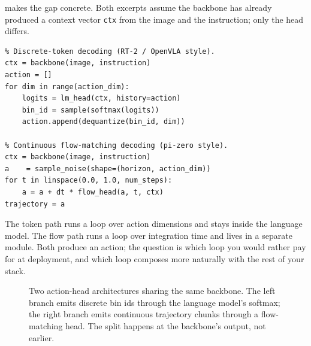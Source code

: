  makes the gap concrete. Both excerpts assume the backbone has already produced a context vector \texttt{ctx} from the image and the instruction; only the head differs.

\begin{verbatim}
% Discrete-token decoding (RT-2 / OpenVLA style).
ctx = backbone(image, instruction)
action = []
for dim in range(action_dim):
    logits = lm_head(ctx, history=action)
    bin_id = sample(softmax(logits))
    action.append(dequantize(bin_id, dim))

% Continuous flow-matching decoding (pi-zero style).
ctx = backbone(image, instruction)
a    = sample_noise(shape=(horizon, action_dim))
for t in linspace(0.0, 1.0, num_steps):
    a = a + dt * flow_head(a, t, ctx)
trajectory = a
\end{verbatim}

 The token path runs a loop over action dimensions and stays inside the language model. The flow path runs a loop over integration time and lives in a separate module. Both produce an action; the question is which loop you would rather pay for at deployment, and which loop composes more naturally with the rest of your stack.

\begin{figure}
\centering
{}
\caption{Two action-head architectures sharing the same backbone. The left branch emits discrete bin ids through the language model's softmax; the right branch emits continuous trajectory chunks through a flow-matching head. The split happens at the backbone's output, not earlier.}
\label{fig:action_heads}
\end{figure}

